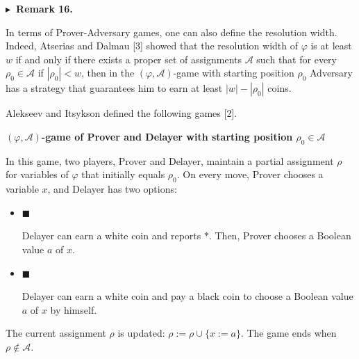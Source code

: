 \par\medskip\noindent\textbf{
$\blacktriangleright$ Remark 16.
}\par



In terms of Prover-Adversary games, one can also define the resolution width.
Indeed, Atserias and Dalmau [3] showed that the resolution width of $\varphi$
is at least $w$ if and only if there exists a proper set of assignments $\mathcal{A}$
such that for every $\rho_{0}\in\mathcal{A}$ if $|\rho_{0}|<w$, then in the
$(\varphi,\mathcal{A})$-game with starting position $\rho_{0}$ Adversary has a strategy
that guarantees him to earn at least $|w|-|\rho_{0}|$ coins.\par




Alekseev and Itsykson defined the following games [2].\par


\par\medskip\noindent\textbf{
$(\varphi,\mathcal{A})$-game of Prover and Delayer with starting position $\rho_{0}\in\mathcal{A}$
}\par


In this game, two players, Prover and Delayer, maintain a partial assignment $\rho$ for
variables of $\varphi$ that initially equals $\rho_{0}$.
On every move, Prover chooses a variable $x$, and Delayer has two options:\par


\begin{itemize}


\item 
$\blacksquare$ 


Delayer can earn a white coin and reports $*$.
Then, Prover chooses a Boolean value $a$ of $x$.\par





\item 
$\blacksquare$ 


Delayer can earn a white coin and pay a black
coin to choose a Boolean value $a$ of $x$ by himself.\par





\end{itemize}


The current assignment $\rho$ is updated: $\rho:=\rho\cup\{x:=a\}$. The game ends when $\rho\notin\mathcal{A}$.\par



